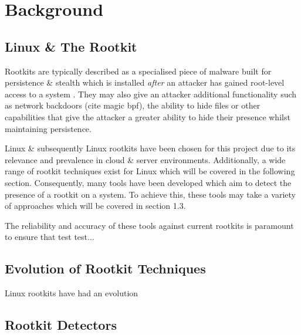 \chapter{Background}


\section{Linux \& The Rootkit}

Rootkits are typically described as a specialised piece of malware built for persistence \& stealth which is installed \textit{after} an attacker has gained root-level access to a system \citep{rootkitNist}.
They may also give an attacker additional functionality such as network backdoors (cite magic bpf), the ability to hide files or other capabilities that give the attacker a greater ability to hide their presence whilst maintaining persistence.

Linux \& subsequently Linux rootkits have been chosen for this project due to its relevance and prevalence in cloud \& server environments. Additionally, a wide range of rootkit techniques exist for Linux which will be covered in the following section.
Consequently, many tools have been developed which aim to detect the presence of a rootkit on a system. To achieve this, these tools may take a variety of approaches which will be covered in section 1.3.

The reliability and accuracy of these tools against current rootkits is paramount to ensure that test test...

\section{Evolution of Rootkit Techniques}

Linux rootkits have had an evolution

\section{Rootkit Detectors}
